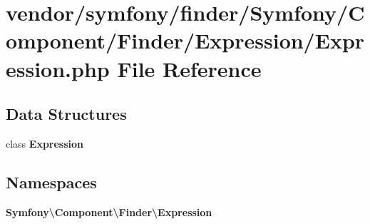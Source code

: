 \section{vendor/symfony/finder/\+Symfony/\+Component/\+Finder/\+Expression/\+Expression.php File Reference}
\label{symfony_2finder_2_symfony_2_component_2_finder_2_expression_2_expression_8php}
\subsection*{Data Structures}
\begin{DoxyCompactItemize}
\item 
class {\bf Expression}
\end{DoxyCompactItemize}
\subsection*{Namespaces}
\begin{DoxyCompactItemize}
\item 
 {\bf Symfony\textbackslash{}\+Component\textbackslash{}\+Finder\textbackslash{}\+Expression}
\end{DoxyCompactItemize}
